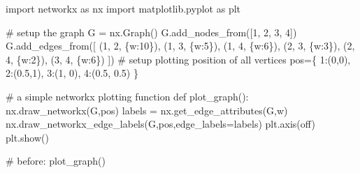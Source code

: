 \documentclass[
  letterpaper,
  DIV=11,
  numbers=noendperiod]{scrartcl}
\newenvironment{Shaded}{\begin{snugshade}}{\end{snugshade}}
\newcommand{\CommentTok}[1]{\textcolor[rgb]{0.37,0.37,0.37}{#1}}
\newcommand{\DecValTok}[1]{\textcolor[rgb]{0.68,0.00,0.00}{#1}}
\newcommand{\FloatTok}[1]{\textcolor[rgb]{0.68,0.00,0.00}{#1}}
\newcommand{\ImportTok}[1]{\textcolor[rgb]{0.00,0.46,0.62}{#1}}
\newcommand{\KeywordTok}[1]{\textcolor[rgb]{0.00,0.23,0.31}{#1}}
\newcommand{\NormalTok}[1]{\textcolor[rgb]{0.00,0.23,0.31}{#1}}
\newcommand{\OperatorTok}[1]{\textcolor[rgb]{0.37,0.37,0.37}{#1}}
\newcommand{\StringTok}[1]{\textcolor[rgb]{0.13,0.47,0.30}{#1}}
\theoremstyle{plain}
\theoremstyle{plain}
\theoremstyle{plain}
\theoremstyle{definition}
\theoremstyle{remark}
\begin{document}
\begin{Shaded}
\begin{Highlighting}[]
\ImportTok{import}\NormalTok{ networkx }\ImportTok{as}\NormalTok{ nx}
\ImportTok{import}\NormalTok{ matplotlib.pyplot }\ImportTok{as}\NormalTok{ plt}

\CommentTok{\# setup the graph}
\NormalTok{G }\OperatorTok{=}\NormalTok{ nx.Graph()}
\NormalTok{G.add\_nodes\_from([}\DecValTok{1}\NormalTok{, }\DecValTok{2}\NormalTok{, }\DecValTok{3}\NormalTok{, }\DecValTok{4}\NormalTok{])}
\NormalTok{G.add\_edges\_from([}
\NormalTok{  (}\DecValTok{1}\NormalTok{, }\DecValTok{2}\NormalTok{, \{}\StringTok{\textquotesingle{}w\textquotesingle{}}\NormalTok{:}\DecValTok{10}\NormalTok{\}),}
\NormalTok{  (}\DecValTok{1}\NormalTok{, }\DecValTok{3}\NormalTok{, \{}\StringTok{\textquotesingle{}w\textquotesingle{}}\NormalTok{:}\DecValTok{5}\NormalTok{\}),}
\NormalTok{  (}\DecValTok{1}\NormalTok{, }\DecValTok{4}\NormalTok{, \{}\StringTok{\textquotesingle{}w\textquotesingle{}}\NormalTok{:}\DecValTok{6}\NormalTok{\}), }
\NormalTok{  (}\DecValTok{2}\NormalTok{, }\DecValTok{3}\NormalTok{, \{}\StringTok{\textquotesingle{}w\textquotesingle{}}\NormalTok{:}\DecValTok{3}\NormalTok{\}), }
\NormalTok{  (}\DecValTok{2}\NormalTok{, }\DecValTok{4}\NormalTok{, \{}\StringTok{\textquotesingle{}w\textquotesingle{}}\NormalTok{:}\DecValTok{2}\NormalTok{\}), }
\NormalTok{  (}\DecValTok{3}\NormalTok{, }\DecValTok{4}\NormalTok{, \{}\StringTok{\textquotesingle{}w\textquotesingle{}}\NormalTok{:}\DecValTok{6}\NormalTok{\})}
\NormalTok{])}
\CommentTok{\# setup plotting position of all vertices}
\NormalTok{pos}\OperatorTok{=}\NormalTok{\{}
  \DecValTok{1}\NormalTok{:(}\DecValTok{0}\NormalTok{,}\DecValTok{0}\NormalTok{),}
  \DecValTok{2}\NormalTok{:(}\FloatTok{0.5}\NormalTok{,}\DecValTok{1}\NormalTok{),}
  \DecValTok{3}\NormalTok{:(}\DecValTok{1}\NormalTok{, }\DecValTok{0}\NormalTok{),}
  \DecValTok{4}\NormalTok{:(}\FloatTok{0.5}\NormalTok{, }\FloatTok{0.5}\NormalTok{)}
\NormalTok{\}}

\CommentTok{\# a simple networkx plotting function}
\KeywordTok{def}\NormalTok{ plot\_graph():}
\NormalTok{  nx.draw\_networkx(G,pos)}
\NormalTok{  labels }\OperatorTok{=}\NormalTok{ nx.get\_edge\_attributes(G,}\StringTok{\textquotesingle{}w\textquotesingle{}}\NormalTok{)}
\NormalTok{  nx.draw\_networkx\_edge\_labels(G,pos,edge\_labels}\OperatorTok{=}\NormalTok{labels)}
\NormalTok{  plt.axis(}\StringTok{\textquotesingle{}off\textquotesingle{}}\NormalTok{)}
\NormalTok{  plt.show()}

\CommentTok{\# before:}
\NormalTok{plot\_graph()}


\end{Highlighting}
\end{Shaded}
\end{document}
